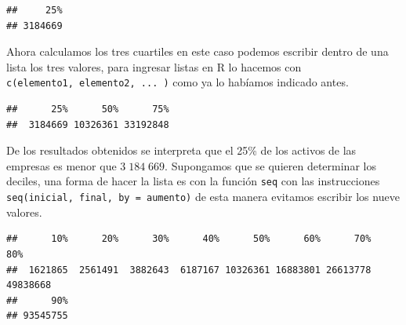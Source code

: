 \documentclass[]{book}
\newenvironment{Shaded}{\begin{snugshade}}{\end{snugshade}}
\newcommand{\DataTypeTok}[1]{\textcolor[rgb]{0.13,0.29,0.53}{#1}}
\newcommand{\FloatTok}[1]{\textcolor[rgb]{0.00,0.00,0.81}{#1}}
\newcommand{\KeywordTok}[1]{\textcolor[rgb]{0.13,0.29,0.53}{\textbf{#1}}}
\newcommand{\NormalTok}[1]{#1}
\newcommand{\OperatorTok}[1]{\textcolor[rgb]{0.81,0.36,0.00}{\textbf{#1}}}
\begin{document}
\begin{Shaded}
\end{Shaded}

\begin{verbatim}
##     25% 
## 3184669
\end{verbatim}

Ahora calculamos los tres cuartiles en este caso podemos escribir dentro de una lista los tres valores, para ingresar listas en R lo hacemos con \texttt{c(elemento1,\ elemento2,\ ...\ )} como ya lo habíamos indicado antes.

\begin{Shaded}
\end{Shaded}

\begin{verbatim}
##      25%      50%      75% 
##  3184669 10326361 33192848
\end{verbatim}

De los resultados obtenidos se interpreta que el 25\% de los activos de las empresas es menor que \(3\;184\;669\). Supongamos que se quieren determinar los deciles, una forma de hacer la lista es con la función \texttt{seq} con las instrucciones \texttt{seq(inicial,\ final,\ by\ =\ aumento)} de esta manera evitamos escribir los nueve valores.

\begin{Shaded}
\end{Shaded}

\begin{verbatim}
##      10%      20%      30%      40%      50%      60%      70%      80% 
##  1621865  2561491  3882643  6187167 10326361 16883801 26613778 49838668 
##      90% 
## 93545755
\end{verbatim}
\end{document}
